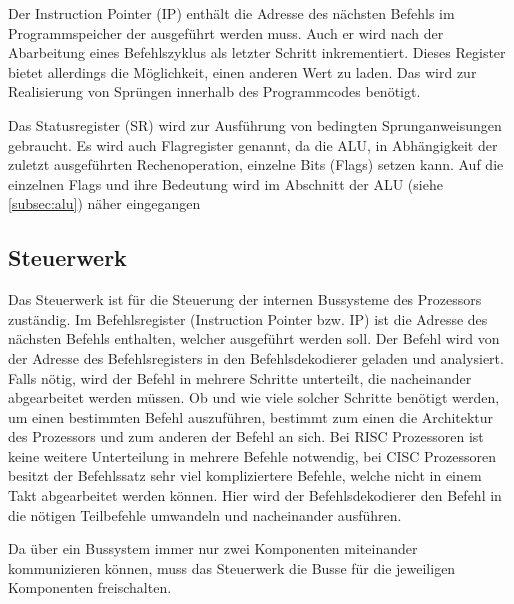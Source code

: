 \documentclass[a4paper,12pt]{article}
\begin{document}
\par \bigskip
\noindent Der Instruction Pointer (IP) enthält die Adresse des nächsten Befehls im Programmspeicher der ausgeführt werden muss. Auch er wird nach der Abarbeitung eines Befehlszyklus als letzter Schritt inkrementiert. Dieses Register bietet allerdings die Möglichkeit, einen anderen Wert zu laden. Das wird zur Realisierung von Sprüngen innerhalb des Programmcodes benötigt. 

\par \bigskip
\noindent Das Statusregister (SR) wird zur Ausführung von bedingten Sprunganweisungen gebraucht. Es wird auch Flagregister genannt, da die ALU, in Abhängigkeit der zuletzt ausgeführten Rechenoperation, einzelne Bits (Flags) setzen kann. Auf die einzelnen Flags und ihre Bedeutung wird im Abschnitt der ALU (siehe \ref{subsec:alu}) näher eingegangen

\subsection{Steuerwerk}
Das Steuerwerk ist für die Steuerung der internen Bussysteme des Prozessors zuständig. Im Befehlsregister (Instruction Pointer bzw. IP) ist die Adresse des nächsten Befehls enthalten, welcher ausgeführt werden soll. Der Befehl wird von der Adresse des Befehlsregisters in den Befehlsdekodierer geladen und analysiert. Falls nötig, wird der Befehl in mehrere Schritte unterteilt, die nacheinander abgearbeitet werden müssen. Ob und wie viele solcher Schritte benötigt werden, um einen bestimmten Befehl auszuführen, bestimmt zum einen die Architektur des Prozessors und zum anderen der Befehl an sich. Bei RISC Prozessoren ist keine weitere Unterteilung in mehrere Befehle notwendig, bei CISC Prozessoren besitzt der Befehlssatz sehr viel kompliziertere Befehle, welche nicht in einem Takt abgearbeitet werden können. Hier wird der Befehlsdekodierer den Befehl in die nötigen Teilbefehle umwandeln und nacheinander ausführen.

\par\smallskip\noindent Da über ein Bussystem immer nur zwei Komponenten miteinander kommunizieren können, muss das Steuerwerk die Busse für die jeweiligen Komponenten freischalten. 
\end{document}
